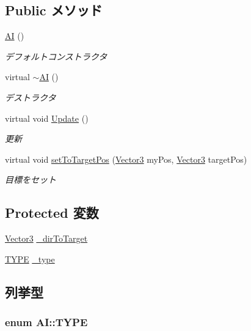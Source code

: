 \subsection*{Public メソッド}
\begin{DoxyCompactItemize}
\item 
\hyperlink{class_a_i_a64ec60281e9eb8496f16525615db54b7}{A\-I} ()
\begin{DoxyCompactList}\small\item\em デフォルトコンストラクタ \end{DoxyCompactList}\item 
virtual \hyperlink{class_a_i_ac86c87957e3d563f6ea2137a97992e0a}{$\sim$\-A\-I} ()
\begin{DoxyCompactList}\small\item\em デストラクタ \end{DoxyCompactList}\item 
virtual void \hyperlink{class_a_i_a59e5ab0650eb03f2e71bc8930fd9a8d5}{Update} ()
\begin{DoxyCompactList}\small\item\em 更新 \end{DoxyCompactList}\item 
virtual void \hyperlink{class_a_i_a90c73117de7e36703b1129e77544cb9e}{set\-To\-Target\-Pos} (\hyperlink{struct_vector3}{Vector3} my\-Pos, \hyperlink{struct_vector3}{Vector3} target\-Pos)
\begin{DoxyCompactList}\small\item\em 目標をセット \end{DoxyCompactList}\end{DoxyCompactItemize}
\subsection*{Protected 変数}
\begin{DoxyCompactItemize}
\item 
\hyperlink{struct_vector3}{Vector3} \hyperlink{class_a_i_a838d47dc2f692ec67f23614345321850}{\-\_\-dir\-To\-Target}
\item 
\hyperlink{class_a_i_ac649e1da72d905f0b48e92c8aeb29bca}{T\-Y\-P\-E} \hyperlink{class_a_i_a2cf982e037b987d40d0d71ad2dec9aeb}{\-\_\-type}
\end{DoxyCompactItemize}


\subsection{列挙型}
\hypertarget{class_a_i_ac649e1da72d905f0b48e92c8aeb29bca}{
\subsubsection[{T\-Y\-P\-E}]{\setlength{\rightskip}{0pt plus 5cm}enum {\bf A\-I\-::\-T\-Y\-P\-E}}}\label{class_a_i_ac649e1da72d905f0b48e92c8aeb29bca}


